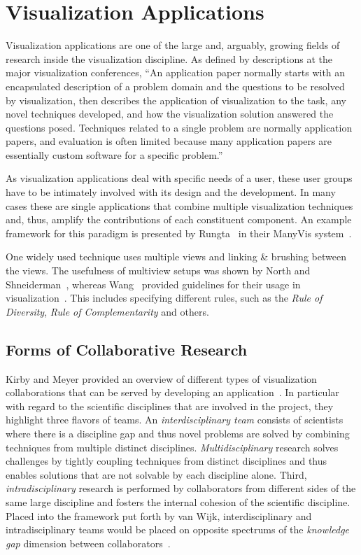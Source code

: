 \section{Visualization Applications} \label{cha:intro:appl}
Visualization applications are one of the large and, arguably, growing fields of research inside the visualization discipline.  As defined by descriptions at the major visualization conferences, ``An application paper normally starts with an encapsulated description of a problem domain and the questions to be resolved by visualization, then describes the application of visualization to the task, any novel techniques developed, and how the visualization solution answered the questions posed. Techniques related to a single problem are normally application papers, and evaluation is often limited because many application papers are essentially custom software for a specific problem.''

As visualization applications deal with specific needs of a user, these user groups have to be intimately involved with its design and the development.  In many cases these are single applications that combine multiple visualization techniques and, thus, amplify the contributions of each constituent component.  An example framework for this paradigm is presented by Rungta \etal\ in their ManyVis system~\cite{rungta2013manyvis}.

One widely used technique uses multiple views and linking \& brushing between the views.  The usefulness of multiview setups was shown by North and Shneiderman~\cite{north1997taxonomy}, whereas Wang \etal\ provided guidelines for their usage in visualization~\cite{wang2000guidelines}.  This includes specifying different rules, such as the \emph{Rule of Diversity}, \emph{Rule of Complementarity} and others.



\subsection{Forms of Collaborative Research} \label{cha:intro:appl:collab}
Kirby and Meyer provided an overview of different types of visualization collaborations that can be served by developing an application~\cite{kirby2013visualization}.  In particular with regard to the scientific disciplines that are involved in the project, they highlight three flavors of teams. An \emph{interdisciplinary team} consists of scientists where there is a discipline gap and thus novel problems are solved by combining techniques from multiple distinct disciplines.  \emph{Multidisciplinary} research solves challenges by tightly coupling techniques from distinct disciplines and thus enables solutions that are not solvable by each discipline alone.  Third, \emph{intradisciplinary} research is performed by collaborators from different sides of the same large discipline and fosters the internal cohesion of the scientific discipline.  Placed into the framework put forth by van Wijk, interdisciplinary and intradisciplinary teams would be placed on opposite spectrums of the \emph{knowledge gap} dimension between collaborators~\cite{van2006bridging}.

